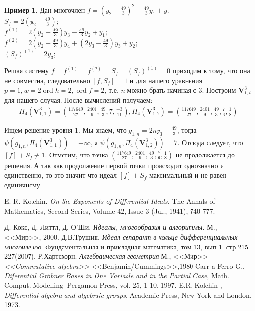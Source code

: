 \documentclass[16pt]{article}
\DeclareMathOperator{\ord}{ord}
\theoremstyle{plain}
\theoremstyle{definition}
\newtheorem{example}[theorem]{Пример}
\theoremstyle{remark}
\begin{document}
\begin{example}
Дан многочлен $f=(y_2-\frac{49}{3})^2-\frac{49}{3}y_1+y$.
\\
$S_f=2(y_2-\frac{49}{3})$;
\\
$f^{(1)}=2(y_2-\frac{49}{3})y_3-\frac{49}{3}y_2+y_1$;
\\
$f^{(2)}=2(y_2-\frac{49}{3})y_4+(2y_3-\frac{49}{3})y_3+y_2$;
\\
$(S_f)^{(1)}=2y_3$;

Решая систему $f=f^{(1)}=f^{(2)}=S_f=(S_f)^{(1)}=0$ приходим к тому,
что она не совместна, следовательно $[f,S_f]=1$ и  для нашего
уравнения $p=1,w=2\ord{h}=2,\ord{f}=2$, т.е. $n$  можно брать начиная с $3$. Построим $\mathbf{V}_{1,i}^3$ для нашего случая. После вычислений получаем: 
\begin{gather*}
\Pi_{4}(\mathbf{V}_{1,1}^3)=\left(\frac{117649}{27},\frac{2401}{9},\frac{49}{3},7,\frac{-3}{11}\right),
\Pi_{4}(\mathbf{V}_{1,2}^3)=\left(\frac{117649}{27},\frac{2401}{9},\frac{49}{3},\frac{7}{6},\frac{1}{8}\right)
\end{gather*}

Ищем решение уровня 1. Мы знаем, что $g_{1,n}=2ny_3-\frac{49}{3}$, тогда $\psi(g_{1,n},\Pi_{4}(\mathbf{V}_{1,1}^3))=-\infty$, а $\psi(g_{1,n},\Pi_{4}(\mathbf{V}_{1,2}^3))=7$. Отсюда следует, что $[f]+S_f\not=1$. Отметим, что точка $\left(\frac{117649}{27},\frac{2401}{9},\frac{49}{3},\frac{7}{6},\frac{1}{8}\right)$ не продолжается до решения.  А так как продолжение первой точки происходит однозначно и единственно, то это значит что идеал $[f]+S_f$ максимальный и не равен единичному.


\end{example}







\begin{thebibliography}{99}

E. R. Kolchin.
\emph{On the Exponents of Differential Ideals.}
The Annals of Mathematics, Second Series, Volume 42, Issue 3 (Jul., 1941), 740-777.

Д. Кокс, Д. Литтл, Д. О'Ши.
\emph{Идеалы, многообразия и алгоритмы.}
М., <<Мир>>, 2000.
Д.В.Трушин.
\emph{Идеал сепарант в кольце дифференциальных многочленов.}
Фундаментальная и прикладная математика, том 13, вып 1, стр.215-227(2007).
Р.Хартсхорн.
\emph{Алгебраическая геометрия}
М., <<Мир>>
\emph{<<Commutative algebra>>}
<<Benjamin/Cummings>>,1980
Carr a Ferro G.,
\emph{ Diferential Gr\"{o}bner Bases in One Variable and in the Partial Case},
Math. Comput. Modelling, Pergamon Press, vol. 25, 1-10, 1997.
E.R. Kolchin ,
\emph{ Differential algebra and algebraic groups}, Academic Press, New York and London, 1973.
\end{thebibliography}
\end{document}
